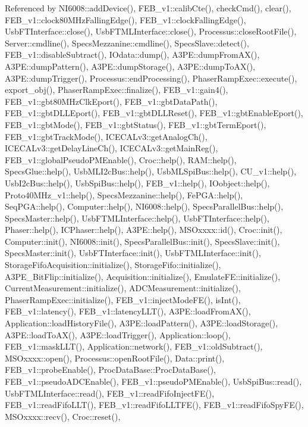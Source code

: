 Referenced by N\+I6008\+::add\+Device(), F\+E\+B\+\_\+v1\+::calib\+Cte(), check\+Cmd(), clear(), F\+E\+B\+\_\+v1\+::clock80\+M\+Hz\+Falling\+Edge(), F\+E\+B\+\_\+v1\+::clock\+Falling\+Edge(), Usb\+F\+T\+Interface\+::close(), Usb\+F\+T\+M\+L\+Interface\+::close(), Processus\+::close\+Root\+File(), Server\+::cmdline(), Specs\+Mezzanine\+::cmdline(), Specs\+Slave\+::detect(), F\+E\+B\+\_\+v1\+::disable\+Subtract(), I\+Odata\+::dump(), A3\+P\+E\+::dump\+From\+A\+X(), A3\+P\+E\+::dump\+Pattern(), A3\+P\+E\+::dump\+Storage(), A3\+P\+E\+::dump\+To\+A\+X(), A3\+P\+E\+::dump\+Trigger(), Processus\+::end\+Processing(), Phaser\+Ramp\+Exec\+::execute(), export\+\_\+obj(), Phaser\+Ramp\+Exec\+::finalize(), F\+E\+B\+\_\+v1\+::gain4(), F\+E\+B\+\_\+v1\+::gbt80\+M\+Hz\+Clk\+Eport(), F\+E\+B\+\_\+v1\+::gbt\+Data\+Path(), F\+E\+B\+\_\+v1\+::gbt\+D\+L\+L\+Eport(), F\+E\+B\+\_\+v1\+::gbt\+D\+L\+L\+Reset(), F\+E\+B\+\_\+v1\+::gbt\+Enable\+Eport(), F\+E\+B\+\_\+v1\+::gbt\+Mode(), F\+E\+B\+\_\+v1\+::gbt\+Status(), F\+E\+B\+\_\+v1\+::gbt\+Term\+Eport(), F\+E\+B\+\_\+v1\+::gbt\+Track\+Mode(), I\+C\+E\+C\+A\+Lv3\+::get\+Analog\+Ch(), I\+C\+E\+C\+A\+Lv3\+::get\+Delay\+Line\+Ch(), I\+C\+E\+C\+A\+Lv3\+::get\+Main\+Reg(), F\+E\+B\+\_\+v1\+::global\+Pseudo\+P\+M\+Enable(), Croc\+::help(), R\+A\+M\+::help(), Specs\+Glue\+::help(), Usb\+M\+L\+I2c\+Bus\+::help(), Usb\+M\+L\+Spi\+Bus\+::help(), C\+U\+\_\+v1\+::help(), Usb\+I2c\+Bus\+::help(), Usb\+Spi\+Bus\+::help(), F\+E\+B\+\_\+v1\+::help(), I\+Oobject\+::help(), Proto40\+M\+Hz\+\_\+v1\+::help(), Specs\+Mezzanine\+::help(), Fe\+P\+G\+A\+::help(), Seq\+P\+G\+A\+::help(), Computer\+::help(), N\+I6008\+::help(), Specs\+Parallel\+Bus\+::help(), Specs\+Master\+::help(), Usb\+F\+T\+M\+L\+Interface\+::help(), Usb\+F\+T\+Interface\+::help(), Phaser\+::help(), I\+C\+Phaser\+::help(), A3\+P\+E\+::help(), M\+S\+Oxxxx\+::id(), Croc\+::init(), Computer\+::init(), N\+I6008\+::init(), Specs\+Parallel\+Bus\+::init(), Specs\+Slave\+::init(), Specs\+Master\+::init(), Usb\+F\+T\+Interface\+::init(), Usb\+F\+T\+M\+L\+Interface\+::init(), Storage\+Fifo\+Acquisition\+::initialize(), Storage\+Fifo\+::initialize(), A3\+P\+E\+\_\+\+Bit\+Flip\+::initialize(), Acquisition\+::initialize(), Emulate\+F\+E\+::initialize(), Current\+Measurement\+::initialize(), A\+D\+C\+Measurement\+::initialize(), Phaser\+Ramp\+Exec\+::initialize(), F\+E\+B\+\_\+v1\+::inject\+Mode\+F\+E(), is\+Int(), F\+E\+B\+\_\+v1\+::latency(), F\+E\+B\+\_\+v1\+::latency\+L\+L\+T(), A3\+P\+E\+::load\+From\+A\+X(), Application\+::load\+History\+File(), A3\+P\+E\+::load\+Pattern(), A3\+P\+E\+::load\+Storage(), A3\+P\+E\+::load\+To\+A\+X(), A3\+P\+E\+::load\+Trigger(), Application\+::loop(), F\+E\+B\+\_\+v1\+::mask\+L\+L\+T(), Application\+::network(), F\+E\+B\+\_\+v1\+::old\+Subtract(), M\+S\+Oxxxx\+::open(), Processus\+::open\+Root\+File(), Data\+::print(), F\+E\+B\+\_\+v1\+::probe\+Enable(), Proc\+Data\+Base\+::\+Proc\+Data\+Base(), F\+E\+B\+\_\+v1\+::pseudo\+A\+D\+C\+Enable(), F\+E\+B\+\_\+v1\+::pseudo\+P\+M\+Enable(), Usb\+Spi\+Bus\+::read(), Usb\+F\+T\+M\+L\+Interface\+::read(), F\+E\+B\+\_\+v1\+::read\+Fifo\+Inject\+F\+E(), F\+E\+B\+\_\+v1\+::read\+Fifo\+L\+L\+T(), F\+E\+B\+\_\+v1\+::read\+Fifo\+L\+L\+T\+F\+E(), F\+E\+B\+\_\+v1\+::read\+Fifo\+Spy\+F\+E(), M\+S\+Oxxxx\+::recv(), Croc\+::reset(), 